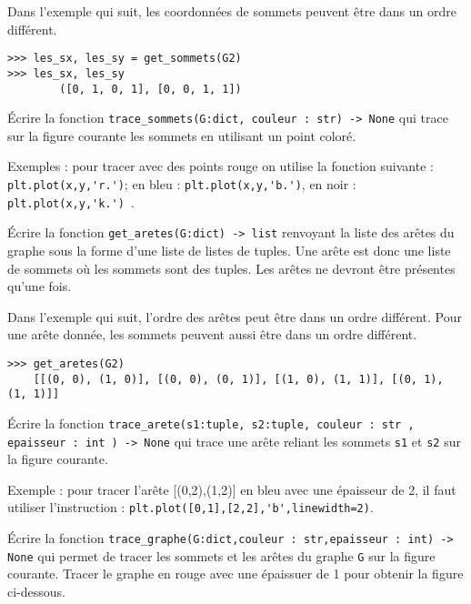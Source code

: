 \begin{exemple}
Dans l'exemple qui suit, les coordonnées de sommets peuvent être dans un ordre différent. 
\begin{lstlisting}
>>> les_sx, les_sy = get_sommets(G2)
>>> les_sx, les_sy
        ([0, 1, 0, 1], [0, 0, 1, 1])
\end{lstlisting}
\end{exemple}


\begin{question}
Écrire la fonction \lstinline{trace_sommets(G:dict, couleur : str) -> None} qui trace sur la figure courante les sommets en utilisant un point coloré.

Exemples : pour tracer avec des points rouge on utilise la fonction suivante : \lstinline{plt.plot(x,y,'r.')};  en bleu : \lstinline{plt.plot(x,y,'b.')}, en noir : \lstinline{plt.plot(x,y,'k.') }.
\end{question}

\begin{question}
Écrire la fonction \lstinline{get_aretes(G:dict) -> list} renvoyant la liste des arêtes du graphe sous la forme d'une liste de listes de tuples. Une arête est donc une liste de sommets où les sommets sont des tuples. Les arêtes ne devront être présentes qu'une fois.
\end{question}

\begin{exemple}
Dans l'exemple qui suit, l'ordre des arêtes peut être dans un ordre différent. Pour une arête donnée, les sommets peuvent aussi être dans un ordre différent.
\begin{lstlisting}
>>> get_aretes(G2)
	[[(0, 0), (1, 0)], [(0, 0), (0, 1)], [(1, 0), (1, 1)], [(0, 1), (1, 1)]]
\end{lstlisting}
\end{exemple}

\begin{question}
Écrire la fonction \lstinline{trace_arete(s1:tuple, s2:tuple, couleur : str , epaisseur : int ) -> None} qui trace une arête reliant les sommets \lstinline{s1} et \lstinline{s2} sur la figure courante. 

Exemple : pour tracer l'arête [(0,2),(1,2)] en bleu avec une épaisseur de 2, il faut utiliser l'instruction : \lstinline{plt.plot([0,1],[2,2],'b',linewidth=2)}.
\end{question}


\begin{question}
Écrire la fonction \lstinline{trace_graphe(G:dict,couleur : str,epaisseur : int) -> None} qui permet de tracer les sommets et les arêtes du graphe \lstinline{G} sur la figure courante. Tracer le graphe en rouge avec une épaissuer de 1 pour obtenir la figure ci-dessous.
\end{question}

